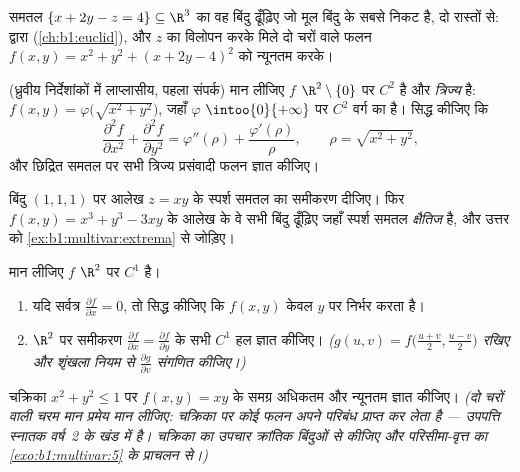 \begin{exercise}[$\star\star\star$]\label{exo:b1:multivar:8}
समतल $\{x + 2y - z = 4\} \subseteq \R^3$ का वह बिंदु ढूँढ़िए जो मूल बिंदु
के सबसे निकट है, दो रास्तों से:  द्वारा
(\cref{ch:b1:euclid}), और $z$ का विलोपन करके मिले दो चरों वाले फलन $f(x, y)
= x^2 + y^2 + (x + 2y - 4)^2$ को न्यूनतम करके।
\end{exercise}

\begin{exercise}[$\star\star\star$]\label{exo:b1:multivar:9}
(ध्रुवीय निर्देशांकों में लाप्लासीय, पहला संपर्क) मान लीजिए $f$ $\R^2
\setminus \{0\}$ पर $C^2$ है और \emph{त्रिज्य} है: $f(x, y) =
\varphi\bigl(\sqrt{x^2+y^2}\bigr)$, जहाँ $\varphi$ $\intoo{0}{+\infty}$ पर
$C^2$ वर्ग का है। सिद्ध कीजिए कि
\[
\frac{\partial^2 f}{\partial x^2} + \frac{\partial^2 f}{\partial
y^2} = \varphi''(\rho) + \frac{\varphi'(\rho)}{\rho},
\qquad \rho = \sqrt{x^2 + y^2},
\]
और छिद्रित समतल पर सभी त्रिज्य प्रसंवादी फलन ज्ञात कीजिए।
\end{exercise}

\begin{exercise}[$\star\star$]\label{exo:b1:multivar:10}
बिंदु $(1, 1, 1)$ पर आलेख $z = xy$ के स्पर्श समतल का समीकरण दीजिए। फिर
$f(x,y) = x^3 + y^3 - 3xy$ के आलेख के वे सभी बिंदु ढूँढ़िए जहाँ स्पर्श
समतल \emph{क्षैतिज} है, और उत्तर को \cref{ex:b1:multivar:extrema} से
जोड़िए।
\end{exercise}

\begin{exercise}[$\star\star$]\label{exo:b1:multivar:11}
मान लीजिए $f$ $\R^2$ पर $C^1$ है।
\begin{enumerate}
  \item यदि सर्वत्र $\frac{\partial f}{\partial x} = 0$, तो सिद्ध कीजिए
        कि $f(x, y)$ केवल $y$ पर निर्भर करता है।
  \item $\R^2$ पर समीकरण $\frac{\partial f}{\partial x} = \frac{\partial
        f}{\partial y}$ के सभी $C^1$ हल ज्ञात कीजिए। \emph{($g(u, v) =
        f\bigl(\frac{u+v}2, \frac{u-v}2\bigr)$ रखिए और शृंखला नियम से
        $\frac{\partial g}{\partial v}$ संगणित कीजिए।)}
\end{enumerate}
\end{exercise}

\begin{exercise}[$\star\star\star$]\label{exo:b1:multivar:12}
 चक्रिका $x^2 + y^2 \leq 1$ पर $f(x, y) = xy$ के समग्र अधिकतम और
न्यूनतम ज्ञात कीजिए। \emph{(दो चरों वाली चरम मान प्रमेय मान लीजिए: 
चक्रिका पर कोई  फलन अपने परिबंध प्राप्त कर लेता है --- उपपत्ति स्नातक
वर्ष~2 के खंड में है।  चक्रिका का उपचार क्रांतिक बिंदुओं से कीजिए और
परिसीमा-वृत्त का \cref{exo:b1:multivar:5} के प्राचलन से।)}
\end{exercise}

